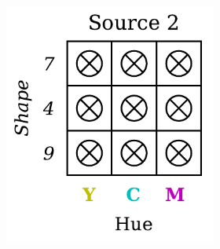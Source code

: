\begin{dataset}
\begin{figure}[H]
\begin{subfigure}[b]{0.45\textwidth}
\begin{subfigure}[b]{0.48\textwidth}
                \includegraphics[width=\textwidth]{img/datasets/ZSO_fact=hue_env=1.pdf}
            \end{subfigure}
        \end{subfigure}
        \hfill
        \begin{subfigure}[b]{0.45\textwidth}
            \centering
            \begin{subfigure}[b]{0.48\textwidth}
                \centering

\end{subfigure}
\end{subfigure}
\end{figure}
\end{dataset}
